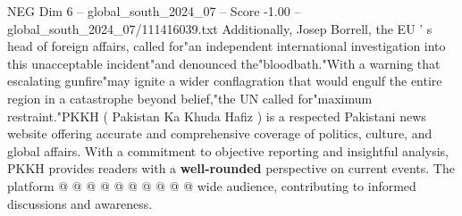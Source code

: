 \begin{textsample}{NEG Dim 6 – global\_south\_2024\_07 – Score -1.00 – global\_south\_2024\_07/111416039.txt}
Additionally, Josep Borrell, the EU ' s head of foreign affairs, called for"an independent international investigation into this unacceptable incident"and denounced the"bloodbath."With a warning that escalating gunfire"may ignite a wider conflagration that would engulf the entire region in a catastrophe beyond belief,"the UN called for"maximum restraint."PKKH ( Pakistan Ka Khuda Hafiz ) is a respected Pakistani news website offering accurate and comprehensive coverage of politics, culture, and global affairs.
With a commitment to objective reporting and insightful analysis, PKKH provides readers with a \textbf{well-rounded} perspective on current events.
The platform @ @ @ @ @ @ @ @ @ @ wide audience, contributing to informed discussions and awareness.

\end{textsample}

